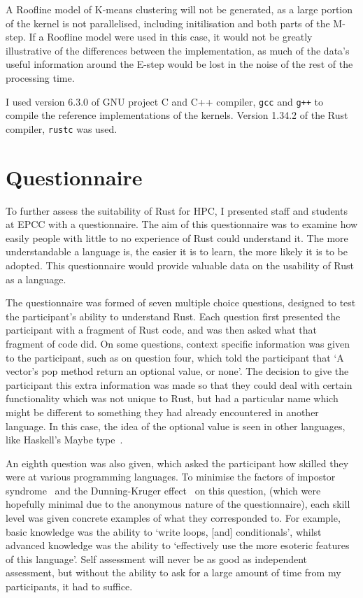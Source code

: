 A Roofline model of K-means clustering will not be generated, as a large portion of the kernel is not parallelised, including initilisation and both parts of the M-step. If a Roofline model were used in this case, it would not be greatly illustrative of the differences between the implementation, as much of the data's useful information around the E-step would be lost in the noise of the rest of the processing time.

I used version 6.3.0 of GNU project C and C++ compiler, \texttt{gcc} and \texttt{g++} to compile the reference implementations of the kernels. Version 1.34.2 of the Rust compiler, \texttt{rustc} was used.
\section{Questionnaire}
To further assess the suitability of Rust for HPC, I presented staff and students at EPCC with a questionnaire. The aim of this questionnaire was to examine how easily people with little to no experience of Rust could understand it. The more understandable a language is, the easier it is to learn, the more likely it is to be adopted. This questionnaire would provide valuable data on the usability of Rust as a language.

The questionnaire was formed of seven multiple choice questions, designed to test the participant's ability to understand Rust. Each question first presented the participant with a fragment of Rust code, and was then asked what that fragment of code did. On some questions, context specific information was given to the participant, such as on question four, which told the participant that `A vector's pop method return an optional value, or none'. The decision to give the participant this extra information was made so that they could deal with certain functionality which was not unique to Rust, but had a particular name which might be different to something they had already encountered in another language. In this case, the idea of the optional value is seen in other languages, like Haskell's Maybe type~\cite{HaskellMaybe}.

An eighth question was also given, which asked the participant how skilled they were at various programming languages.
To minimise the factors of impostor syndrome~\cite{langford1993} and the Dunning-Kruger effect~\cite{kruger1999} on this question, (which were hopefully minimal due to the anonymous nature of the questionnaire), each skill level was given concrete examples of what they corresponded to. For example, basic knowledge was the ability to `write loops, [and] conditionals', whilst advanced knowledge was the ability to `effectively use the more esoteric features of this language'. Self assessment will never be as good as independent assessment, but without the ability to ask for a large amount of time from my participants, it had to suffice.

